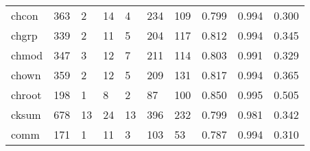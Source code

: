 \begin{longtable}{lp{2.0cm}p{2.0cm}p{2.0cm}p{2.0cm}p{2.0cm}p{2.0cm}p{2.0cm}p{2.0cm}p{2.0cm}}
chcon     &                    363 &                                  2 &                                14 &                                4 &                               234 &                             109 &                                   0.799 &                                  0.994 &                                0.300 \\
chgrp     &                    339 &                                  2 &                                11 &                                5 &                               204 &                             117 &                                   0.812 &                                  0.994 &                                0.345 \\
chmod     &                    347 &                                  3 &                                12 &                                7 &                               211 &                             114 &                                   0.803 &                                  0.991 &                                0.329 \\
chown     &                    359 &                                  2 &                                12 &                                5 &                               209 &                             131 &                                   0.817 &                                  0.994 &                                0.365 \\
chroot    &                    198 &                                  1 &                                 8 &                                2 &                                87 &                             100 &                                   0.850 &                                  0.995 &                                0.505 \\
cksum     &                    678 &                                 13 &                                24 &                               13 &                               396 &                             232 &                                   0.799 &                                  0.981 &                                0.342 \\
comm      &                    171 &                                  1 &                                11 &                                3 &                               103 &                              53 &                                   0.787 &                                  0.994 &                                0.310 \\

\end{longtable}
